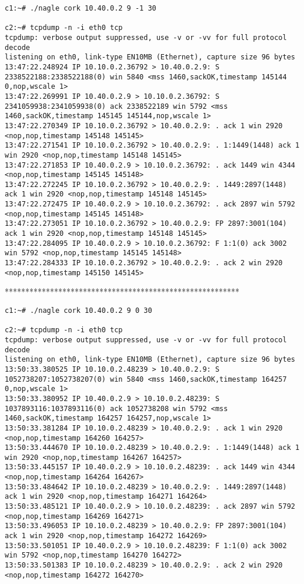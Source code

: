 \documentclass[a4paper,12pt]{article}
\begin{document}
\begin{lstlisting}
c1:~# ./nagle cork 10.40.0.2 9 -1 30

c2:~# tcpdump -n -i eth0 tcp
tcpdump: verbose output suppressed, use -v or -vv for full protocol decode
listening on eth0, link-type EN10MB (Ethernet), capture size 96 bytes
13:47:22.248924 IP 10.10.0.2.36792 > 10.40.0.2.9: S 2338522188:2338522188(0) win 5840 <mss 1460,sackOK,timestamp 145144 0,nop,wscale 1>
13:47:22.269991 IP 10.40.0.2.9 > 10.10.0.2.36792: S 2341059938:2341059938(0) ack 2338522189 win 5792 <mss 1460,sackOK,timestamp 145145 145144,nop,wscale 1>
13:47:22.270349 IP 10.10.0.2.36792 > 10.40.0.2.9: . ack 1 win 2920 <nop,nop,timestamp 145148 145145>
13:47:22.271541 IP 10.10.0.2.36792 > 10.40.0.2.9: . 1:1449(1448) ack 1 win 2920 <nop,nop,timestamp 145148 145145>
13:47:22.271853 IP 10.40.0.2.9 > 10.10.0.2.36792: . ack 1449 win 4344 <nop,nop,timestamp 145145 145148>
13:47:22.272245 IP 10.10.0.2.36792 > 10.40.0.2.9: . 1449:2897(1448) ack 1 win 2920 <nop,nop,timestamp 145148 145145>
13:47:22.272475 IP 10.40.0.2.9 > 10.10.0.2.36792: . ack 2897 win 5792 <nop,nop,timestamp 145145 145148>
13:47:22.273051 IP 10.10.0.2.36792 > 10.40.0.2.9: FP 2897:3001(104) ack 1 win 2920 <nop,nop,timestamp 145148 145145>
13:47:22.284095 IP 10.40.0.2.9 > 10.10.0.2.36792: F 1:1(0) ack 3002 win 5792 <nop,nop,timestamp 145145 145148>
13:47:22.284333 IP 10.10.0.2.36792 > 10.40.0.2.9: . ack 2 win 2920 <nop,nop,timestamp 145150 145145>
\end{lstlisting}

*********************************************************

\begin{lstlisting}
c1:~# ./nagle cork 10.40.0.2 9 0 30

c2:~# tcpdump -n -i eth0 tcp
tcpdump: verbose output suppressed, use -v or -vv for full protocol decode
listening on eth0, link-type EN10MB (Ethernet), capture size 96 bytes
13:50:33.380525 IP 10.10.0.2.48239 > 10.40.0.2.9: S 1052738207:1052738207(0) win 5840 <mss 1460,sackOK,timestamp 164257 0,nop,wscale 1>
13:50:33.380952 IP 10.40.0.2.9 > 10.10.0.2.48239: S 1037893116:1037893116(0) ack 1052738208 win 5792 <mss 1460,sackOK,timestamp 164257 164257,nop,wscale 1>
13:50:33.381284 IP 10.10.0.2.48239 > 10.40.0.2.9: . ack 1 win 2920 <nop,nop,timestamp 164260 164257>
13:50:33.444670 IP 10.10.0.2.48239 > 10.40.0.2.9: . 1:1449(1448) ack 1 win 2920 <nop,nop,timestamp 164267 164257>
13:50:33.445157 IP 10.40.0.2.9 > 10.10.0.2.48239: . ack 1449 win 4344 <nop,nop,timestamp 164264 164267>
13:50:33.484642 IP 10.10.0.2.48239 > 10.40.0.2.9: . 1449:2897(1448) ack 1 win 2920 <nop,nop,timestamp 164271 164264>
13:50:33.485121 IP 10.40.0.2.9 > 10.10.0.2.48239: . ack 2897 win 5792 <nop,nop,timestamp 164269 164271>
13:50:33.496053 IP 10.10.0.2.48239 > 10.40.0.2.9: FP 2897:3001(104) ack 1 win 2920 <nop,nop,timestamp 164272 164269>
13:50:33.501051 IP 10.40.0.2.9 > 10.10.0.2.48239: F 1:1(0) ack 3002 win 5792 <nop,nop,timestamp 164270 164272>
13:50:33.501383 IP 10.10.0.2.48239 > 10.40.0.2.9: . ack 2 win 2920 <nop,nop,timestamp 164272 164270>
\end{lstlisting}
\end{document}
